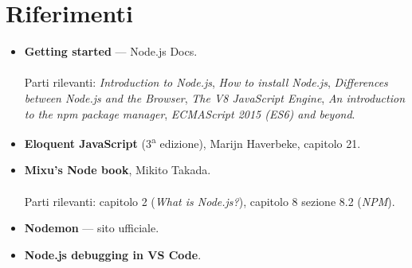 \section{Riferimenti}

\begin{itemize}
  \item \textbf{Getting started} --- Node.js Docs. \\
         \\
        Parti rilevanti: \textit{Introduction to Node.js}, \textit{How to
        install Node.js}, \textit{Differences between Node.js and the Browser},
        \textit{The V8 JavaScript Engine}, \textit{An introduction to the npm
        package manager}, \textit{ECMAScript 2015 (ES6) and beyond}.
  \item \textbf{Eloquent JavaScript} (3\textsuperscript{a} edizione), Marijn
        Haverbeke, capitolo 21. \\
  \item \textbf{Mixu's Node book}, Mikito Takada. \\
         \\
        Parti rilevanti: capitolo 2 (\textit{What is Node.js?}), capitolo 8
        sezione 8.2 (\textit{NPM}).
  \item \textbf{Nodemon} --- sito ufficiale. \\
  \item \textbf{Node.js debugging in VS Code}. \\
\end{itemize}
